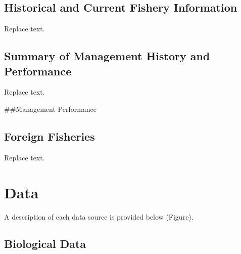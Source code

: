 \documentclass[11pt,
  english,
  a4paper,
]{article}
\begin{document}

\hypertarget{historical-and-current-fishery-information}{%
\subsection{Historical and Current Fishery Information}\label{historical-and-current-fishery-information}}

\leavevmode\tagmcend\tagstructend

Replace text.


\hypertarget{summary-of-management-history-and-performance}{%
\subsection{Summary of Management History and Performance}\label{summary-of-management-history-and-performance}}

\leavevmode\tagmcend\tagstructend

Replace text.

\#\#Management Performance


\hypertarget{foreign-fisheries}{%
\subsection{Foreign Fisheries}\label{foreign-fisheries}}

\leavevmode\tagmcend\tagstructend

Replace text.


\hypertarget{data}{%
\section{Data}\label{data}}

\leavevmode\tagmcend\tagstructend

A description of each data source is provided below (Figure).


\hypertarget{biological-data}{%
\subsection{Biological Data}\label{biological-data}}
\end{document}
